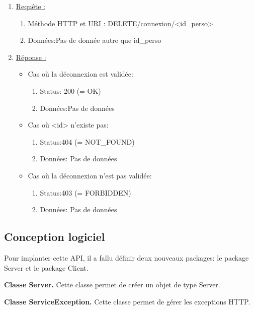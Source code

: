 \documentclass[11pt, a4paper]{article}
\begin{document}
  \begin{enumerate}
   \item \underline{Requête :}
    \begin{enumerate}
     \item Méthode HTTP et URI : DELETE/connexion/<id\_perso>
     \item Données:Pas de donnée autre que id\_perso
		     
    \end{enumerate}

   \item \underline{Réponse :}
   \begin{itemize}
    \item Cas où la déconnexion est validée:
    \begin{enumerate}
     \item Status: 200 (= OK)
     \item Données:Pas de données\\	 
    \end{enumerate}
    \item Cas où <id> n'existe pas:
    \begin{enumerate}
     \item Status:404 (= NOT\_FOUND)
     \item Données: Pas de données\\
    \end{enumerate}    
    \item Cas où la déconnexion n'est pas validée:
    \begin{enumerate}
     \item Status:403 (= FORBIDDEN)
     \item Données: Pas de données\\
    \end{enumerate}
    
   \end{itemize}

  \end{enumerate}
  

  \subsection{Conception logiciel}
  Pour implanter cette API, il a fallu définir deux nouveaux packages: le package Server et le package Client.
  
  \textbf{Classe Server.} Cette classe permet de créer un objet de type Server.
  
  \textbf{Classe ServiceException.} Cette classe permet de gérer les exceptions HTTP.
  
\end{document}
